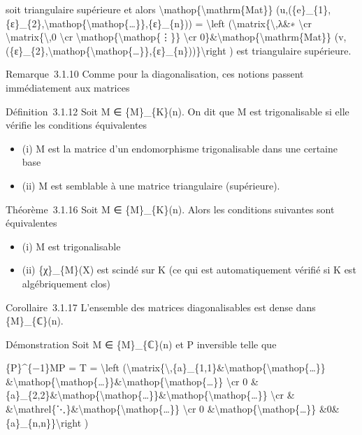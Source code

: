 \documentclass[]{article}
\begin{document}
\begin{itemize}
  soit triangulaire supérieure et alors
  \textbackslash{}mathop\{\textbackslash{}mathrm\{Mat\}\}
  (u,(\{e\}\_\{1\},\{ε\}\_\{2\},\textbackslash{}mathop\{\textbackslash{}mathop\{\ldots{}\}\},\{ε\}\_\{n\}))
  = \textbackslash{}left (\textbackslash{}matrix\{\textbackslash{},λ\&∗
  \textbackslash{}cr \textbackslash{}matrix\{\textbackslash{},0
  \textbackslash{}cr
  \textbackslash{}mathop\{\textbackslash{}mathop\{⋮\}\}
  \textbackslash{}cr
  0\}\&\textbackslash{}mathop\{\textbackslash{}mathrm\{Mat\}\}
  (v,(\{ε\}\_\{2\},\textbackslash{}mathop\{\textbackslash{}mathop\{\ldots{}\}\},\{ε\}\_\{n\}))\}\textbackslash{}right
  ) est triangulaire supérieure.
\end{itemize}

Remarque~3.1.10 Comme pour la diagonalisation, ces notions passent
immédiatement aux matrices

Définition~3.1.12 Soit M ∈ \{M\}\_\{K\}(n). On dit que M est
trigonalisable si elle vérifie les conditions équivalentes

\begin{itemize}
\itemsep1pt\parskip0pt
\item
  (i) M est la matrice d'un endomorphisme trigonalisable dans une
  certaine base
\item
  (ii) M est semblable à une matrice triangulaire (supérieure).
\end{itemize}

Théorème~3.1.16 Soit M ∈ \{M\}\_\{K\}(n). Alors les conditions suivantes
sont équivalentes

\begin{itemize}
\itemsep1pt\parskip0pt
\item
  (i) M est trigonalisable
\item
  (ii) \{χ\}\_\{M\}(X) est scindé sur K (ce qui est automatiquement
  vérifié si K est algébriquement clos)
\end{itemize}

Corollaire~3.1.17 L'ensemble des matrices diagonalisables est dense dans
\{M\}\_\{ℂ\}(n).

Démonstration Soit M ∈ \{M\}\_\{ℂ\}(n) et P inversible telle que

\{P\}\^{}\{−1\}MP = T = \textbackslash{}left
(\textbackslash{}matrix\{\textbackslash{},\{a\}\_\{1,1\}\&\textbackslash{}mathop\{\textbackslash{}mathop\{\ldots{}\}\}
\&\textbackslash{}mathop\{\textbackslash{}mathop\{\ldots{}\}\}\&\textbackslash{}mathop\{\textbackslash{}mathop\{\ldots{}\}\}
\textbackslash{}cr 0
\&\{a\}\_\{2,2\}\&\textbackslash{}mathop\{\textbackslash{}mathop\{\ldots{}\}\}\&\textbackslash{}mathop\{\textbackslash{}mathop\{\ldots{}\}\}
\textbackslash{}cr \&
\&\textbackslash{}mathrel\{⋱\}\&\textbackslash{}mathop\{\textbackslash{}mathop\{\ldots{}\}\}
\textbackslash{}cr 0
\&\textbackslash{}mathop\{\textbackslash{}mathop\{\ldots{}\}\}
\&0\&\{a\}\_\{n,n\}\}\textbackslash{}right )
\end{document}
